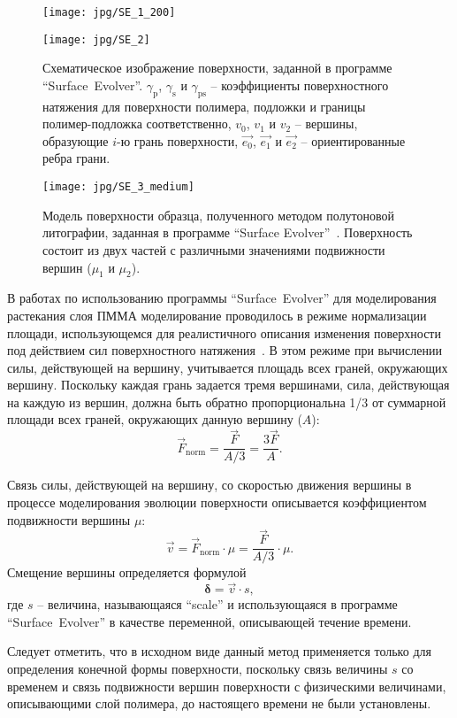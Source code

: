 \begin{figure}
	\begin{minipage}{0.55\textwidth}
		\texttt{[image: jpg/SE\_1\_200]}
	\end{minipage}
	\begin{minipage}{0.4\textwidth}
		\texttt{[image: jpg/SE\_2]}
	\end{minipage}
	\vspace{0.5em}
	\caption{Схематическое изображение поверхности, заданной в программе ``Surface~Evolver''. $\gamma_\mathrm{p}$, $\gamma_\mathrm{s}$ и $\gamma_\mathrm{ps}$ -- коэффициенты поверхностного натяжения для поверхности полимера, подложки и границы полимер-подложка соответственно, $v_0$, $v_1$ и $v_2$ -- вершины, образующие $i$-ю грань поверхности, $\vec{e_0}$, $\vec{e_1}$ и $\vec{e_2}$ -- ориентированные ребра грани.}
	\label{fig:SE_12}
\end{figure}

\begin{figure}[h]
	\begin{center}
		\texttt{[image: jpg/SE\_3\_medium]}
		\vspace{1em}
		\caption{Модель поверхности образца, полученного методом полутоновой литографии, заданная в программе ``Surface Evolver''~\cite{Kirchner_reflow}. Поверхность состоит из двух частей с различными значениями подвижности вершин ($\mu_1$ и $\mu_2$).}
		\label{fig:SE_3}
	\end{center}
\end{figure}

В работах по использованию программы ``Surface~Evolver'' для моделирования растекания слоя ПММА моделирование проводилось в режиме нормализации площади, использующемся для реалистичного описания изменения поверхности под действием сил поверхностного натяжения~\cite{Kirchner_reflow}.
В этом режиме при вычислении силы, действующей на вершину, учитывается площадь всех граней, окружающих вершину. Поскольку каждая грань задается тремя вершинами,
сила, действующая на каждую из вершин, должна быть обратно пропорциональна 1/3 от суммарной площади всех граней, окружающих данную вершину ($A$):
\begin{equation}
	\vec{F}_\mathrm{norm} = \frac{\vec{F}}{A/3} = \frac{3\vec{F}}{A}.
\end{equation}

Связь силы, действующей на вершину, со скоростью движения вершины в процессе моделирования эволюции поверхности описывается коэффициентом подвижности вершины $\mu$:
\begin{equation} \label{eq:SE_v}
	\vec{v} = \vec{F}_\mathrm{norm} \cdot \mu = \frac{\vec{F}}{A/3} \cdot \mu.
\end{equation}
Смещение вершины определяется формулой
\begin{equation} \label{eq:SE_delta}
	\boldsymbol{\delta} = \vec{v} \cdot s,
\end{equation}
где $s$ -- величина, называющаяся ``scale'' и использующаяся в программе ``Surface~Evolver'' в качестве переменной, описывающей течение времени.

Следует отметить, что в исходном виде данный метод применяется только для определения конечной формы поверхности, поскольку связь величины $s$ со временем и связь подвижности вершин поверхности с физическими величинами, описывающими слой полимера, до настоящего времени не были установлены.
